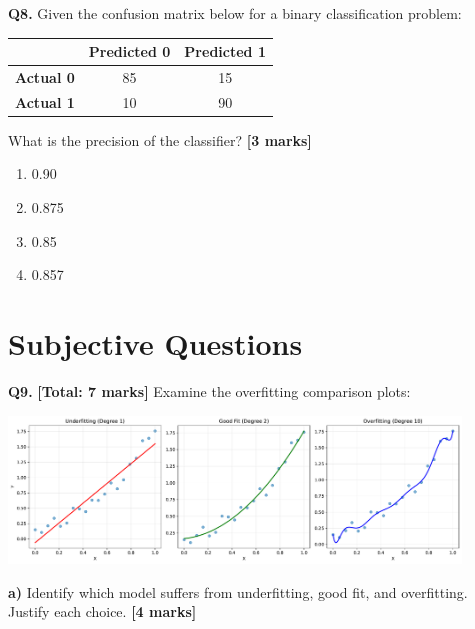\documentclass{article}
\begin{document}
\vspace{0.3cm}

\textbf{Q8.} Given the confusion matrix below for a binary classification problem:

\begin{center}
\begin{tabular}{|c|c|c|}
\hline
 & \textbf{Predicted 0} & \textbf{Predicted 1} \\
\hline
\textbf{Actual 0} & 85 & 15 \\
\hline
\textbf{Actual 1} & 10 & 90 \\
\hline
\end{tabular}
\end{center}

What is the precision of the classifier? \textbf{[3 marks]}

\begin{enumerate}[label=(\Alph*)]

  \item 0.90

  \item 0.875

  \item 0.85

  \item 0.857

\end{enumerate}

\vspace{0.3cm}




\section*{Subjective Questions}

\textbf{Q9.} \textbf{[Total: 7 marks]} Examine the overfitting comparison plots:

\begin{center}
\includegraphics[width=0.9\textwidth]{figures/overfitting_comparison.pdf}
\end{center}

\textbf{a)} Identify which model suffers from underfitting, good fit, and overfitting. Justify each choice. \textbf{[4 marks]}
\end{document}
